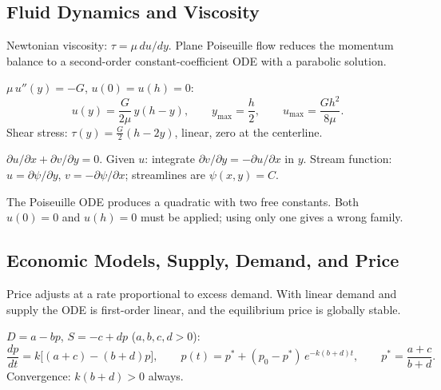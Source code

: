\subsection{Fluid Dynamics and Viscosity}

Newtonian viscosity: $\tau = \mu\,du/dy$. Plane Poiseuille flow reduces the
momentum balance to a second-order constant-coefficient ODE with a parabolic solution.

\begin{formulabox}
$\mu\,u''(y) = -G$, $u(0) = u(h) = 0$:
\[
  u(y) = \frac{G}{2\mu}\,y(h - y), \qquad
  y_{\max} = \frac{h}{2}, \qquad
  u_{\max} = \frac{Gh^2}{8\mu}.
\]
Shear stress: $\tau(y) = \tfrac{G}{2}(h - 2y)$, linear, zero at the centerline.
\end{formulabox}

\begin{formulabox}
$\partial u/\partial x + \partial v/\partial y = 0$.
Given $u$: integrate $\partial v/\partial y = -\partial u/\partial x$ in $y$.
Stream function: $u = \partial\psi/\partial y$, $v = -\partial\psi/\partial x$;
streamlines are $\psi(x,y) = C$.
\end{formulabox}

\begin{warningbox}
The Poiseuille ODE produces a quadratic with two free constants. Both
$u(0) = 0$ and $u(h) = 0$ must be applied; using only one gives a wrong family.
\end{warningbox}

\subsection{Economic Models, Supply, Demand, and Price}

Price adjusts at a rate proportional to excess demand. With linear demand and
supply the ODE is first-order linear, and the equilibrium price is globally stable.

\begin{formulabox}
$D = a - bp$, $S = -c + dp$ ($a,b,c,d > 0$):
\[
  \frac{dp}{dt} = k\bigl[(a+c) - (b+d)p\bigr],
  \qquad
  p(t) = p^* + (p_0 - p^*)\,e^{-k(b+d)t},
  \qquad
  p^* = \frac{a+c}{b+d}.
\]
Convergence: $k(b+d) > 0$ always.
\end{formulabox}

